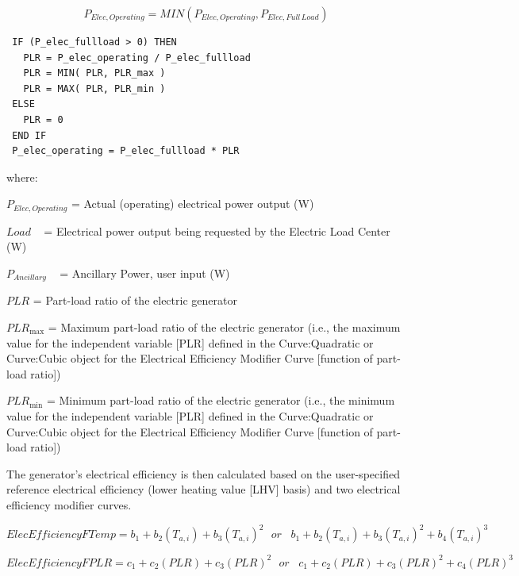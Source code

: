 \begin{equation}
{P_{Elec,Operating}} = MIN\left( {{P_{Elec,Operating}},{P_{Elec,Full\,Load}}} \right)
\end{equation}

\begin{lstlisting}
 IF (P_elec_fullload > 0) THEN
   PLR = P_elec_operating / P_elec_fullload
   PLR = MIN( PLR, PLR_max )
   PLR = MAX( PLR, PLR_min )
 ELSE
   PLR = 0
 END IF
 P_elec_operating = P_elec_fullload * PLR
\end{lstlisting}

where:

\({P_{Elec,Operating}}\) = Actual (operating) electrical power output (W)

\(Load\) ~ = Electrical power output being requested by the Electric Load Center (W)

\({P_{Ancillary}}\) ~ = Ancillary Power, user input (W)

\(PLR\) = Part-load ratio of the electric generator

\(PL{R_{\max }}\) = Maximum part-load ratio of the electric generator (i.e., the maximum value for the independent variable {[}PLR{]} defined in the Curve:Quadratic or Curve:Cubic object for the Electrical Efficiency Modifier Curve {[}function of part-load ratio{]})

\(PL{R_{\min }}\) = Minimum part-load ratio of the electric generator (i.e., the minimum value for the independent variable {[}PLR{]} defined in the Curve:Quadratic or Curve:Cubic object for the Electrical Efficiency Modifier Curve {[}function of part-load ratio{]})

The generator's electrical efficiency is then calculated based on the user-specified reference electrical efficiency (lower heating value {[}LHV{]} basis) and two electrical efficiency modifier curves.

\begin{equation}
ElecEfficiencyFTemp = {b_1} + {b_2}\left( {{T_{a,i}}} \right) + {b_3}{\left( {{T_{a,i}}} \right)^2}\,\,\,\,or\,\,\,\,\,{b_1} + {b_2}\left( {{T_{a,i}}} \right) + {b_3}{\left( {{T_{a,i}}} \right)^2} + {b_4}{\left( {{T_{a,i}}} \right)^3}
\end{equation}

\begin{equation}
ElecEfficiencyFPLR = {c_1} + {c_2}\left( {PLR} \right) + {c_3}{\left( {PLR} \right)^2}\,\,\,\,or\,\,\,\,\,{c_1} + {c_2}\left( {PLR} \right) + {c_3}{\left( {PLR} \right)^2} + {c_4}{\left( {PLR} \right)^3}
\end{equation}


